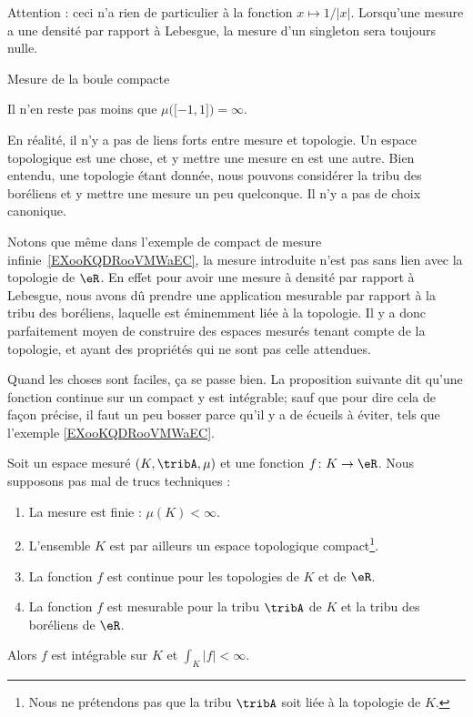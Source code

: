 \begin{example}
\begin{subproof}
    Attention : ceci n'a rien de particulier à la fonction \( x\mapsto 1/| x |\). Lorsqu'une mesure a une densité par rapport à Lebesgue, la mesure d'un singleton sera toujours nulle.

\item[Mesure de la boule compacte]

    Il n'en reste pas moins que \( \mu\big( \mathopen[ -1 , 1 \mathclose] \big)=\infty\).

    \end{subproof}
\end{example}

\begin{normaltext}
     En réalité, il n'y a pas de liens forts entre mesure et topologie. Un espace topologique est une chose, et y mettre une mesure en est une autre. Bien entendu, une topologie étant donnée, nous pouvons considérer la tribu des boréliens et y mettre une mesure un peu quelconque. Il n'y a pas de choix canonique.

     Notons que même dans l'exemple de compact de mesure infinie~\ref{EXooKQDRooVMWaEC}, la mesure introduite n'est pas sans lien avec la topologie de \( \eR\). En effet pour avoir une mesure à densité par rapport à Lebesgue, nous avons dû prendre une application mesurable par rapport à la tribu des boréliens, laquelle est éminemment liée à la topologie. Il y a donc parfaitement moyen de construire des espaces mesurés tenant compte de la topologie, et ayant des propriétés qui ne sont pas celle attendues.
\end{normaltext}

Quand les choses sont faciles, ça se passe bien. La proposition suivante dit qu'une fonction continue sur un compact y est intégrable; sauf que pour dire cela de façon précise, il faut un peu bosser parce qu'il y a de écueils à éviter, tels que l'exemple \ref{EXooKQDRooVMWaEC}.
\begin{proposition}      \label{PROPooKFRSooANzglT}
    Soit un espace mesuré \( (K,\tribA, \mu)\) et une fonction \( f\colon K\to \eR\). Nous supposons pas mal de trucs techniques :
    \begin{enumerate}
        \item
            La mesure est finie : \( \mu(K)<\infty\). 
        \item
            L'ensemble \( K\) est par ailleurs un espace topologique compact\footnote{Nous ne prétendons pas que la tribu \( \tribA\) soit liée à la topologie de \( K\).}. 
        \item   \label{ITEMooBKYHooWnxUGL}
            La fonction \( f\) est continue pour les topologies de \( K\) et de \( \eR\).
        \item   \label{ITEMooJCNUooJzIlKI}
            La fonction \( f\) est mesurable pour la tribu \( \tribA\) de \( K\) et la tribu des boréliens de \( \eR\).
    \end{enumerate}
    Alors \( f\) est intégrable sur \( K\) et \( \int_K| f |<\infty\).
\end{proposition}

